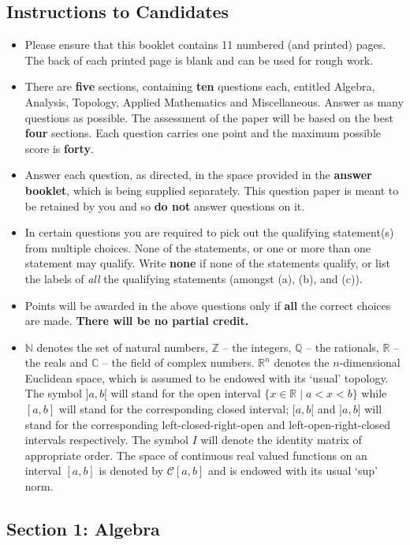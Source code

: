 \documentclass[11pt,a4paper]{article}
\newcommand{\N}{\mathbb{N}}
\newcommand{\Z}{\mathbb{Z}}
\newcommand{\Q}{\mathbb{Q}}
\newcommand{\R}{\mathbb{R}}
\newcommand{\C}{\mathbb{C}}
\newcommand{\examsec}[1]{%
  \subsection*{#1}
  \vspace{-2pt}
}
\begin{document}
\subsection*{Instructions to Candidates}
\begin{itemize}
  \item Please ensure that this booklet contains 11 numbered (and printed) pages. The back of each printed page is blank and can be used for rough work.
  \item There are \textbf{five} sections, containing \textbf{ten} questions each, entitled Algebra, Analysis, Topology, Applied Mathematics and Miscellaneous. Answer as many questions as possible. The assessment of the paper will be based on the best \textbf{four} sections. Each question carries one point and the maximum possible score is \textbf{forty}.
  \item Answer each question, as directed, in the space provided in the \textbf{answer booklet}, which is being supplied separately. This question paper is meant to be retained by you and so \textbf{do not} answer questions on it.
  \item In certain questions you are required to pick out the qualifying statement(s) from multiple choices. None of the statements, or one or more than one statement may qualify. Write \textbf{none} if none of the statements qualify, or list the labels of \emph{all} the qualifying statements (amongst (a), (b), and (c)).
  \item Points will be awarded in the above questions only if \textbf{all} the correct choices are made. \textbf{There will be no partial credit.}
  \item $\N$ denotes the set of natural numbers, $\Z$ -- the integers, $\Q$ -- the rationals, $\R$ -- the reals and $\C$ -- the field of complex numbers. $\R^n$ denotes the $n$-dimensional Euclidean space, which is assumed to be endowed with its `usual' topology. The symbol $]a, b[$ will stand for the open interval $\{x \in \R \mid a < x < b\}$ while $[a, b]$ will stand for the corresponding closed interval; $[a, b[$ and $]a, b]$ will stand for the corresponding left-closed-right-open and left-open-right-closed intervals respectively. The symbol $I$ will denote the identity matrix of appropriate order. The space of continuous real valued functions on an interval $[a, b]$ is denoted by $\mathcal{C}[a, b]$ and is endowed with its usual `sup' norm.
\end{itemize}

\examsec{Section 1: Algebra}
\end{document}
